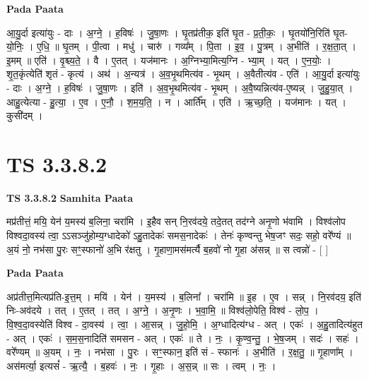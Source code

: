 \documentclass[17pt]{extarticle}
\begin{document}
\textbf{Pada Paata} \newline

आ॒यु॒र्दा इत्या॑युः - दाः । अ॒ग्ने॒ । ह॒विषः॑ । जु॒षा॒णः । घृ॒तप्र॑तीक॒ इति॑ घृ॒त - प्र॒ती॒कः॒ । घृ॒तयो॑नि॒रिति॑ घृ॒त-यो॒निः॒ । ए॒धि॒ ॥ घृ॒तम् । पी॒त्वा । मधु॑ । चारु॑ । गव्य᳚म् । पि॒ता । इ॒व॒ । पु॒त्रम् । अ॒भीति॑ । र॒क्ष॒ता॒त् । इ॒मम् ॥ एति॑ । वृ॒श्च्य॒ते॒ । वै । ए॒तत् । यज॑मानः । अ॒ग्निभ्या॒मित्य॒ग्नि - भ्या॒म् । यत् । ए॒न॒योः॒ । शृ॒त॒कृंत्येति॑ शृतं - कृत्य॑ । अथ॑ । अ॒न्यत्र॑ । अ॒व॒भृ॒थमित्य॑व - भृ॒थम् । अ॒वैतीत्य॑व - एति॑ । आ॒यु॒र्दा इत्या॑युः - दाः । अ॒ग्ने॒ । ह॒विषः॑ । जु॒षा॒णः । इति॑ । अ॒व॒भृ॒थमित्य॑व - भृ॒थम् । अ॒वै॒ष्यन्नित्य॑व-ए॒ष्यन्न् । जु॒हु॒या॒त् । आहु॒त्येत्या - हु॒त्या॒ । ए॒व । ए॒नौ॒ । श॒म॒य॒ति॒ । न । आर्ति᳚म् । एति॑ । ऋ॒च्छ॒ति॒ । यज॑मानः । यत् । कुसी॑दम् ।  \newline




\section*{ TS 3.3.8.2 }

\textbf{TS 3.3.8.2 } \newline
\textbf{Samhita Paata} \newline

मप्र॑तीत्तं॒ मयि॒ येन॑ य॒मस्य॑ ब॒लिना॒ चरा॑मि । इ॒हैव सन् नि॒रव॑दये॒ तदे॒तत् तद॑ग्ने अनृ॒णो भ॑वामि । विश्व॑लोप विश्वदा॒वस्य॑ त्वा॒ ऽऽसञ्जु॑होम्य॒ग्धादेको॑ ऽहु॒तादेकः॑ समस॒नादेकः॑ । तेनः॑ कृण्वन्तु भेष॒जꣳ सदः॒ सहो॒ वरे᳚ण्यं ॥ अ॒यं नो॒ नभ॑सा पु॒रः सꣳ॒॒स्फानो॑ अ॒भि र॑क्षतु । गृ॒हाणा॒मस॑मर्त्यै ब॒हवो॑ नो गृ॒हा अ॑सन्न् ॥ स त्वन्नो॑ - [  ] \newline

\textbf{Pada Paata} \newline

अप्र॑तीत्त॒मित्यप्र॑ति-इ॒त्त॒म् । मयि॑ । येन॑ । य॒मस्य॑ । ब॒लिना᳚ । चरा॑मि ॥ इ॒ह । ए॒व । सन्न् । नि॒रव॑दय॒ इति॑ निः-अव॑दये । तत् । ए॒तत् । तत् । अ॒ग्ने॒ । अ॒नृ॒णः । भ॒वा॒मि॒ ॥ विश्व॑लो॒पेति॒ विश्व॑ - लो॒प॒ । वि॒श्व॒दा॒वस्येति॑ विश्व - दा॒वस्य॑ । त्वा॒ । आ॒सन्न् । जु॒हो॒मि॒ । अ॒ग्धादित्य॑ग्ध - अत् । एकः॑ । अ॒हु॒तादित्य॑हुत - अत् । एकः॑ । स॒म॒स॒नादिति॑ समसन - अत् । एकः॑ ॥ ते । नः॒ । कृ॒ण्व॒न्तु॒ । भे॒ष॒जम् । सदः॑ । सहः॑ । वरे᳚ण्यम् ॥ अ॒यम् । नः॒ । नभ॑सा । पु॒रः । सꣳ॒॒स्फान॒ इति॑ सं - स्फानः॑ । अ॒भीति॑ । र॒क्ष॒तु॒ ॥ गृ॒हाणा᳚म् । अस॑मर्त्या॒ इत्यसं᳚ - ऋ॒त्यै॒ । ब॒हवः॑ । नः॒ । गृ॒हाः । अ॒स॒न्न् ॥ सः । त्वम् । नः॒ ।  \newline
\end{document}
